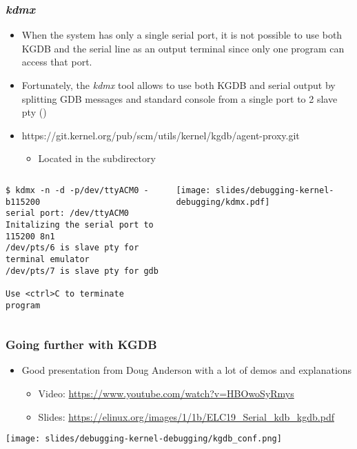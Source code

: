 \begin{frame}[fragile]
  \frametitle{{\em kdmx}}
  \begin{itemize}
    \item When the system has only a single serial port, it is not possible to
          use both KGDB and the serial line as an output terminal since only one
          program can access that port.
    \item Fortunately, the {\em kdmx} tool allows to use both KGDB and serial
          output by splitting GDB messages and standard console from a single
          port to 2 slave pty ()
    \item https://git.kernel.org/pub/scm/utils/kernel/kgdb/agent-proxy.git
    \begin{itemize}
      \item Located in the subdirectory 
    \end{itemize}
  \end{itemize}
  \begin{columns}
    \begin{block}{}
      \begin{verbatim}
$ kdmx -n -d -p/dev/ttyACM0 -b115200
serial port: /dev/ttyACM0
Initalizing the serial port to 115200 8n1
/dev/pts/6 is slave pty for terminal emulator
/dev/pts/7 is slave pty for gdb

Use <ctrl>C to terminate program
      \end{verbatim}
    \end{block}
    \texttt{[image: slides/debugging-kernel-debugging/kdmx.pdf]}
  \end{columns}
\end{frame}

\begin{frame}[fragile]
  \frametitle{Going further with KGDB}
  \begin{itemize}
    \item Good presentation from Doug Anderson with a lot of demos and
          explanations
    \begin{itemize}
      \item Video: \url{https://www.youtube.com/watch?v=HBOwoSyRmys}
      \item Slides: \url{https://elinux.org/images/1/1b/ELC19_Serial_kdb_kgdb.pdf}
    \end{itemize}
  \end{itemize}
  \vspace{0.5cm}
  \begin{center}
  \center\texttt{[image: slides/debugging-kernel-debugging/kgdb\_conf.png]}
  \end{center}
\end{frame}

